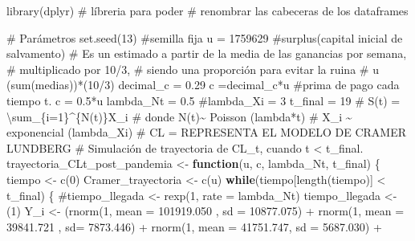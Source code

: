 \documentclass[
  us-letterpaper,
]{scrreprt}
\newenvironment{Shaded}{\begin{snugshade}}{\end{snugshade}}
\newcommand{\AttributeTok}[1]{\textcolor[rgb]{0.40,0.45,0.13}{#1}}
\newcommand{\CommentTok}[1]{\textcolor[rgb]{0.37,0.37,0.37}{#1}}
\newcommand{\ControlFlowTok}[1]{\textcolor[rgb]{0.00,0.23,0.31}{\textbf{#1}}}
\newcommand{\DecValTok}[1]{\textcolor[rgb]{0.68,0.00,0.00}{#1}}
\newcommand{\FloatTok}[1]{\textcolor[rgb]{0.68,0.00,0.00}{#1}}
\newcommand{\FunctionTok}[1]{\textcolor[rgb]{0.28,0.35,0.67}{#1}}
\newcommand{\NormalTok}[1]{\textcolor[rgb]{0.00,0.23,0.31}{#1}}
\newcommand{\OtherTok}[1]{\textcolor[rgb]{0.00,0.23,0.31}{#1}}
\newcommand{\SpecialCharTok}[1]{\textcolor[rgb]{0.37,0.37,0.37}{#1}}
\theoremstyle{plain}
\theoremstyle{plain}
\theoremstyle{definition}
\theoremstyle{remark}
\begin{document}
\begin{Shaded}
\begin{Highlighting}[]
\FunctionTok{library}\NormalTok{(dplyr) }\CommentTok{\# líbreria para poder }
\CommentTok{\# renombrar las cabeceras de los dataframes}

\CommentTok{\# Parámetros}
\FunctionTok{set.seed}\NormalTok{(}\DecValTok{13}\NormalTok{) }\CommentTok{\#semilla fija}
\NormalTok{u }\OtherTok{=} \DecValTok{1759629} \CommentTok{\#surplus(capital inicial de salvamento)}
\CommentTok{\# Es un estimado a partir de la media de las ganancias por semana, }
\CommentTok{\# multiplicado por 10/3, }
\CommentTok{\# siendo una proporción para evitar la ruina}
\CommentTok{\# u (sum(medias))*(10/3)}
\NormalTok{decimal\_c }\OtherTok{=} \FloatTok{0.29}
\NormalTok{c }\OtherTok{=}\NormalTok{decimal\_c}\SpecialCharTok{*}\NormalTok{u }\CommentTok{\#prima de pago cada tiempo t. c = 0.5*u}
\NormalTok{lambda\_Nt }\OtherTok{=} \FloatTok{0.5}
\CommentTok{\#lambda\_Xi = 3}
\NormalTok{t\_final }\OtherTok{=} \DecValTok{19}
\CommentTok{\# S(t) = \textbackslash{}sum\_\{i=1\}\^{}\{N(t)\}X\_i}
\CommentTok{\# donde N(t)\textasciitilde{} Poisson (lambda*t)}
\CommentTok{\# X\_i \textasciitilde{} exponencial (lambda\_Xi)}
\CommentTok{\# CL = REPRESENTA EL MODELO DE CRAMER LUNDBERG}
\CommentTok{\# Simulación de trayectoria de CL\_t, cuando t \textless{} t\_final.}
\NormalTok{trayectoria\_CLt\_post\_pandemia }\OtherTok{\textless{}{-}} \ControlFlowTok{function}\NormalTok{(u, c, lambda\_Nt, t\_final)}
\NormalTok{\{}
\NormalTok{  tiempo }\OtherTok{\textless{}{-}} \FunctionTok{c}\NormalTok{(}\DecValTok{0}\NormalTok{)}
\NormalTok{  Cramer\_trayectoria }\OtherTok{\textless{}{-}} \FunctionTok{c}\NormalTok{(u)}
  \ControlFlowTok{while}\NormalTok{(tiempo[}\FunctionTok{length}\NormalTok{(tiempo)] }\SpecialCharTok{\textless{}}\NormalTok{ t\_final)}
\NormalTok{  \{}
    \CommentTok{\#tiempo\_llegada \textless{}{-} rexp(1, rate = lambda\_Nt)}
\NormalTok{    tiempo\_llegada }\OtherTok{\textless{}{-}}\NormalTok{ (}\DecValTok{1}\NormalTok{)}
\NormalTok{    Y\_i }\OtherTok{\textless{}{-}}\NormalTok{  (}\FunctionTok{rnorm}\NormalTok{(}\DecValTok{1}\NormalTok{, }\AttributeTok{mean =} \FloatTok{101919.050}\NormalTok{ , }\AttributeTok{sd =} \FloatTok{10877.075}\NormalTok{) }\SpecialCharTok{+} 
              \FunctionTok{rnorm}\NormalTok{(}\DecValTok{1}\NormalTok{, }\AttributeTok{mean =}  \FloatTok{39841.721}\NormalTok{ , }\AttributeTok{sd=} \FloatTok{7873.446}\NormalTok{)  }\SpecialCharTok{+}  
              \FunctionTok{rnorm}\NormalTok{(}\DecValTok{1}\NormalTok{, }\AttributeTok{mean =}   \FloatTok{41751.747}\NormalTok{, }\AttributeTok{sd =} \FloatTok{5687.030}\NormalTok{) }\SpecialCharTok{+} 

\end{Highlighting}
\end{Shaded}
\end{document}
